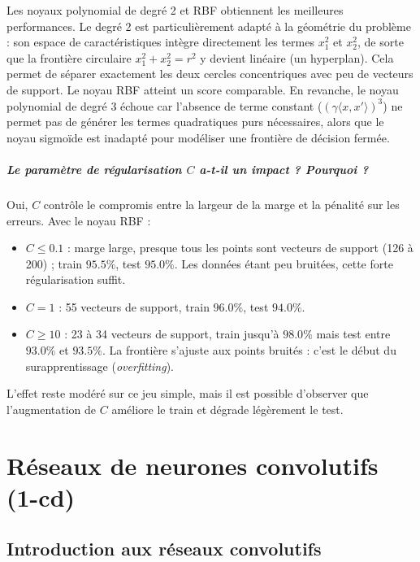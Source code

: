 \documentclass{report}
\begin{document}
Les noyaux polynomial de degré 2 et RBF obtiennent les meilleures performances. Le degré 2 est particulièrement adapté à la géométrie du problème : son espace de caractéristiques intègre directement les termes $x_1^2$ et $x_2^2$, de sorte que la frontière circulaire $x_1^2 + x_2^2 = r^2$ y devient linéaire (un hyperplan). Cela permet de séparer exactement les deux cercles concentriques avec peu de vecteurs de support. Le noyau RBF atteint un score comparable. En revanche, le noyau polynomial de degré 3 échoue car l'absence de terme constant ($(\gamma \langle x, x' \rangle)^3$) ne permet pas de générer les termes quadratiques purs nécessaires, alors que le noyau sigmoïde est inadapté pour modéliser une frontière de décision fermée.

\paragraph{Le paramètre de régularisation $C$ a-t-il un impact ? Pourquoi ?}
Oui, $C$ contrôle le compromis entre la largeur de la marge et la pénalité sur les erreurs. Avec le noyau RBF :
\begin{itemize}
    \item $C \leq 0.1$ : marge large, presque tous les points sont vecteurs de support (126 à 200) ; train $95.5\%$, test $95.0\%$. Les données étant peu bruitées, cette forte régularisation suffit.
    \item $C = 1$ : 55 vecteurs de support, train $96.0\%$, test $94.0\%$.
    \item $C \geq 10$ : 23 à 34 vecteurs de support, train jusqu'à $98.0\%$ mais test entre $93.0\%$ et $93.5\%$. La frontière s'ajuste aux points bruités : c'est le début du surapprentissage (\textit{overfitting}).
\end{itemize}
L'effet reste modéré sur ce jeu simple, mais il est possible d'observer que l'augmentation de $C$ améliore le train et dégrade légèrement le test.

\chapter{Réseaux de neurones convolutifs (1-cd)}

\section{Introduction aux réseaux convolutifs}
\end{document}
